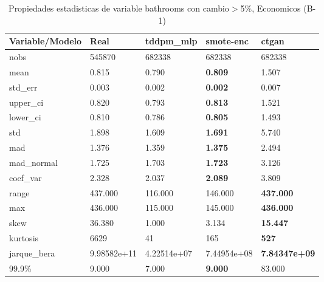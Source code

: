 \begin{table}[H]
\centering
\fontsize{8}{14}\selectfont
\caption{Propiedades estadisticas de variable bathrooms con cambio\ensuremath{>}5\%, Economicos (B-1)}
\label{table-stats-economicos-b-1-bathrooms-short}
\begin{tabular}{|l|m{10em}|m{10em}|m{10em}|m{10em}|}
\hline
 \rowcolor[gray]{0.8}
Variable/Modelo & Real & tddpm\_mlp & smote-enc & ctgan \\
\hline nobs & 545870 & 682338 & 682338 & 682338 \\
\hline mean & 0.815 & 0.790 & \bfseries 0.809 & \cellcolor[rgb]{0.9, 0.54, 0.52} 1.507 \\
\hline std\_err & 0.003 & 0.002 & \bfseries 0.002 & \cellcolor[rgb]{0.9, 0.54, 0.52} 0.007 \\
\hline upper\_ci & 0.820 & 0.793 & \bfseries 0.813 & \cellcolor[rgb]{0.9, 0.54, 0.52} 1.521 \\
\hline lower\_ci & 0.810 & 0.786 & \bfseries 0.805 & \cellcolor[rgb]{0.9, 0.54, 0.52} 1.493 \\
\hline std & 1.898 & 1.609 & \bfseries 1.691 & \cellcolor[rgb]{0.9, 0.54, 0.52} 5.740 \\
\hline mad & 1.376 & 1.359 & \bfseries 1.375 & \cellcolor[rgb]{0.9, 0.54, 0.52} 2.494 \\
\hline mad\_normal & 1.725 & 1.703 & \bfseries 1.723 & \cellcolor[rgb]{0.9, 0.54, 0.52} 3.126 \\
\hline coef\_var & 2.328 & 2.037 & \bfseries 2.089 & \cellcolor[rgb]{0.9, 0.54, 0.52} 3.809 \\
\hline range & 437.000 & \cellcolor[rgb]{0.9, 0.54, 0.52} 116.000 & 146.000 & \bfseries 437.000 \\
\hline max & 436.000 & \cellcolor[rgb]{0.9, 0.54, 0.52} 115.000 & 145.000 & \bfseries 436.000 \\
\hline skew & 36.380 & \cellcolor[rgb]{0.9, 0.54, 0.52} 1.000 & 3.134 & \bfseries 15.447 \\
\hline kurtosis & 6629 & \cellcolor[rgb]{0.9, 0.54, 0.52} 41 & 165 & \bfseries 527 \\
\hline jarque\_bera & 9.98582e+11 & \cellcolor[rgb]{0.9, 0.54, 0.52} 4.22514e+07 & 7.44954e+08 & \bfseries 7.84347e+09 \\
\hline 99.9\% & 9.000 & 7.000 & \bfseries 9.000 & \cellcolor[rgb]{0.9, 0.54, 0.52} 83.000 \\
\hline
\end{tabular}
\end{table}

